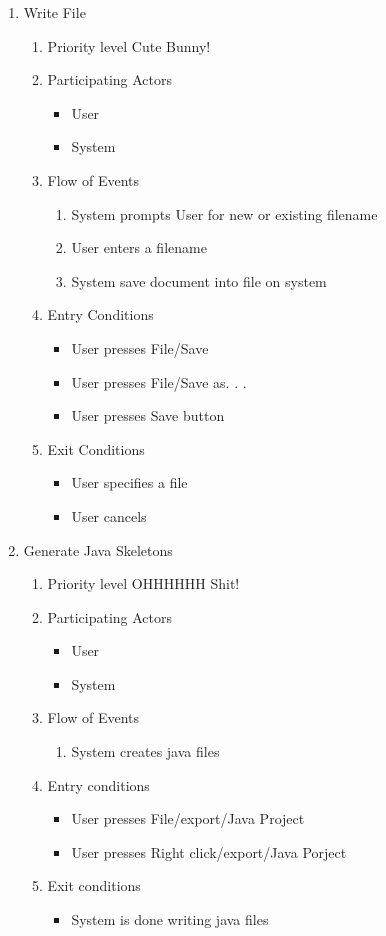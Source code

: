 \documentclass[a4paper, 12pt]{article}
\begin{document}
\begin{enumerate}
	\item Write File
	\begin {enumerate}
		\item Priority level Cute Bunny!
		\item Participating Actors
		\begin {itemize}
			\item User
			\item System
		\end {itemize}
		\item Flow of Events
		\begin {enumerate}
			\item System prompts User for new or existing filename
			\item User enters a filename
			\item System save document into file on system
		\end {enumerate}
		\item Entry Conditions
		\begin {itemize}
			\item User presses File/Save
			\item User presses File/Save as. . .
			\item User presses Save button
		\end {itemize}
		\item Exit Conditions
		\begin {itemize}
			\item User specifies a file
			\item User cancels
		\end {itemize}
	\end {enumerate}

	\item Generate Java Skeletons
	\begin {enumerate}
		\item Priority level OHHHHHH Shit!
		\item Participating Actors
		\begin {itemize}
			\item User
			\item System
		\end {itemize}
		\item Flow of Events
		\begin {enumerate}
			\item System creates java files
		\end {enumerate}
		\item Entry conditions
		\begin {itemize}
			\item User presses File/export/Java Project
			\item User presses Right click/export/Java Porject
		\end {itemize}
		\item Exit conditions
		\begin {itemize}
			\item System is done writing java files
		\end{itemize}
	\end {enumerate}


\end{enumerate}
\end{document}
